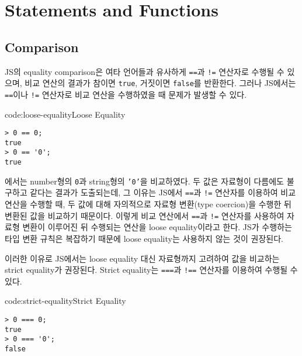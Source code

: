 \section{Statements and Functions} \label{sect:statements-and-functions}

\subsection*{Comparison}

JS의 equality comparison은 여타 언어들과 유사하게 \texttt{==}과 \texttt{!=} 연산자로 수행될 수 있으며, 비교 연산의 결과가 참이면 \texttt{true}, 거짓이면 \texttt{false}를 반환한다. 그러나 JS에서는 \texttt{==}이나 \texttt{!=} 연산자로 비교 연산을 수행하였을 때 문제가 발생할 수 있다.

\begin{codeenv}{code:loose-equality}{Loose Equality}\begin{verbatim}
> 0 == 0;
true
> 0 == '0';
true
\end{verbatim}
\end{codeenv}

에서는 number형의 \texttt{0}과 string형의 \texttt{'0'}을 비교하였다. 두 값은 자료형이 다름에도 불구하고 같다는 결과가 도출되는데, 그 이유는 JS에서 \texttt{==}과 \texttt{!=} 연산자를 이용하여 비교 연산을 수행할 때, 두 값에 대해 자의적으로 자료형 변환(type coercion)을 수행한 뒤 변환된 값을 비교하기 때문이다. 이렇게 비교 연산에서 \texttt{==}과 \texttt{!=} 연산자를 사용하여 자료형 변환이 이루어진 뒤 수행되는 연산을 loose equality이라고 한다. JS가 수행하는 타입 변환 규칙은 복잡하기 때문에 loose equality는 사용하지 않는 것이 권장된다.


이러한 이유로 JS에서는 loose equality 대신 자료형까지 고려하여 값을 비교하는 strict equality가 권장된다. Strict equality는 \texttt{===}과 \texttt{!==} 연산자를 이용하여 수행될 수 있다.

\begin{codeenv}{code:strict-equality}{Strict Equality}\begin{verbatim}
> 0 === 0;
true
> 0 === '0';
false
\end{verbatim}
\end{codeenv}
\newpage

